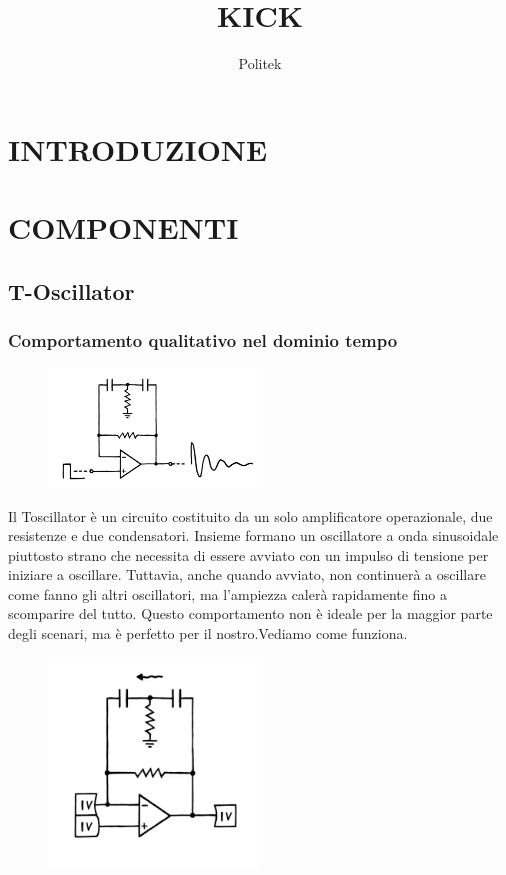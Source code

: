 \documentclass{article}
\title{KICK}
\author{Politek}
\begin{document}
\maketitle



\section{INTRODUZIONE}



\section{COMPONENTI}
\subsection{T-Oscillator}

\subsubsection{Comportamento qualitativo nel dominio tempo}
\begin{figure}[h]
    \centering
    \includegraphics[width=0.5\textwidth]{Toscillator.png} 
    \label{fig:label}
\end{figure}
Il Toscillator è un  circuito costituito da un solo amplificatore operazionale, due resistenze e due condensatori. Insieme formano un oscillatore a onda sinusoidale piuttosto strano che necessita di essere avviato con un impulso di tensione per iniziare a oscillare. Tuttavia, anche quando avviato, non continuerà a oscillare come fanno gli altri oscillatori, ma l'ampiezza calerà rapidamente fino a scomparire del tutto. Questo comportamento non è ideale per la maggior parte degli scenari, ma è perfetto per il nostro.Vediamo come funziona.

\begin{figure}[h]
    \centering
    \includegraphics[width=0.5\textwidth]{Toscillator1.png} 
    \label{fig:label}
\end{figure}
\end{document}
